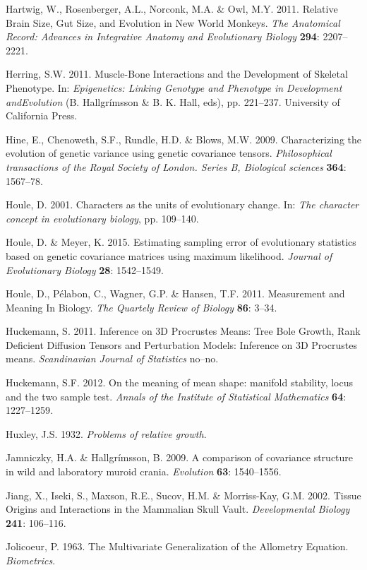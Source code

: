 \documentclass[12pt,twoside]{report}
\begin{document}
Hartwig, W., Rosenberger, A.L., Norconk, M.A. \& Owl, M.Y. 2011.
Relative Brain Size, Gut Size, and Evolution in New World Monkeys.
\emph{The Anatomical Record: Advances in Integrative Anatomy and
Evolutionary Biology} \textbf{294}: 2207--2221.

Herring, S.W. 2011. Muscle-Bone Interactions and the Development of
Skeletal Phenotype. In: \emph{Epigenetics: Linking Genotype and
Phenotype in Development andEvolution} (B. Hallgrímsson \& B. K. Hall,
eds), pp. 221--237. University of California Press.

Hine, E., Chenoweth, S.F., Rundle, H.D. \& Blows, M.W. 2009.
Characterizing the evolution of genetic variance using genetic
covariance tensors. \emph{Philosophical transactions of the Royal
Society of London. Series B, Biological sciences} \textbf{364}:
1567--78.

Houle, D. 2001. Characters as the units of evolutionary change. In:
\emph{The character concept in evolutionary biology}, pp. 109--140.

Houle, D. \& Meyer, K. 2015. Estimating sampling error of evolutionary
statistics based on genetic covariance matrices using maximum
likelihood. \emph{Journal of Evolutionary Biology} \textbf{28}:
1542--1549.

Houle, D., Pélabon, C., Wagner, G.P. \& Hansen, T.F. 2011. Measurement
and Meaning In Biology. \emph{The Quartely Review of Biology}
\textbf{86}: 3--34.

Huckemann, S. 2011. Inference on 3D Procrustes Means: Tree Bole Growth,
Rank Deficient Diffusion Tensors and Perturbation Models: Inference on
3D Procrustes means. \emph{Scandinavian Journal of Statistics} no--no.

Huckemann, S.F. 2012. On the meaning of mean shape: manifold stability,
locus and the two sample test. \emph{Annals of the Institute of
Statistical Mathematics} \textbf{64}: 1227--1259.

Huxley, J.S. 1932. \emph{Problems of relative growth}.

Jamniczky, H.A. \& Hallgrímsson, B. 2009. A comparison of covariance
structure in wild and laboratory muroid crania. \emph{Evolution}
\textbf{63}: 1540--1556.

Jiang, X., Iseki, S., Maxson, R.E., Sucov, H.M. \& Morriss-Kay, G.M.
2002. Tissue Origins and Interactions in the Mammalian Skull Vault.
\emph{Developmental Biology} \textbf{241}: 106--116.

Jolicoeur, P. 1963. The Multivariate Generalization of the Allometry
Equation. \emph{Biometrics}.
\end{document}
